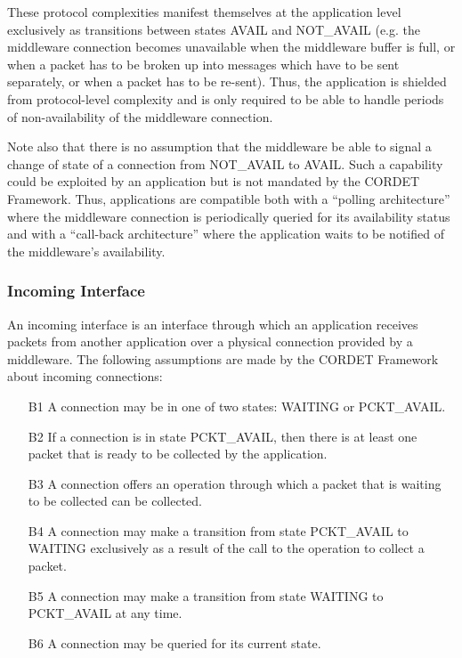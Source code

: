 These protocol complexities manifest themselves at the application level exclusively as transitions between states AVAIL and NOT\_AVAIL (e.g. the middleware connection  becomes unavailable when the middleware buffer is full, or when a packet has to be broken up into messages which have to be sent separately, or when a packet has to be re-sent). Thus, the application is shielded from protocol-level complexity and is only required to be able to handle periods of non-availability of the middleware connection.

Note also that there is no assumption that the middleware be able to signal a change of state of a connection from NOT\_AVAIL to AVAIL. Such a capability could be exploited by an application but is not mandated by the CORDET Framework. Thus, applications are compatible both with a “polling architecture” where the middleware connection is periodically queried for its availability status and with a “call-back architecture” where the application waits to be notified of the middleware's availability. 

\subsubsection{Incoming Interface}\label{sec:IncomingConnections}

An incoming interface is an interface through which an application receives packets from another application over a physical connection provided by a middleware. The following assumptions are made by the CORDET Framework about incoming connections:

\begin{itemize}
\item[B1]{A connection may be in one of two states: WAITING or PCKT\_AVAIL.}
\item[B2]{If a connection is in state PCKT\_AVAIL, then there is at least one packet that is ready to be collected by the application.}
\item[B3]{A connection offers an operation through which a packet that is waiting to be collected can be collected.}
\item[B4]{A connection may make a transition from state PCKT\_AVAIL to WAITING exclusively as a result of the call to the operation to collect a packet.}
\item[B5]{A connection may make a transition from state WAITING to PCKT\_AVAIL at any time.}
\item[B6]{A connection may be queried for its current state.}
\end{itemize}

